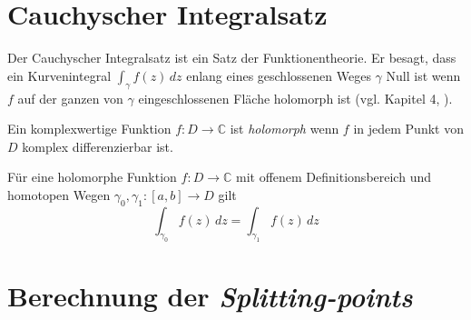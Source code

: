 \section{Cauchyscher Integralsatz}

Der Cauchyscher Integralsatz ist ein Satz der Funktionentheorie. Er besagt, dass ein Kurvenintegral $\int_{\gamma}^{} f(z)\,dz $ enlang eines geschlossenen Weges $\gamma$ Null ist wenn
$f$ auf der ganzen von $\gamma$ eingeschlossenen Fläche holomorph ist (vgl. Kapitel 4, \cite{futheo}).

Ein komplexwertige Funktion $f: D \rightarrow \mathbb{C}$ ist \textit{holomorph} wenn $f$ in jedem Punkt von $D$ komplex differenzierbar ist.
\cite{futheo}

Für eine holomorphe Funktion $f: D \rightarrow \mathbb{C}$ mit offenem Definitionsbereich und homotopen Wegen $\gamma_0, \gamma_1: [a,b] \rightarrow D$ gilt 
\begin{equation}
    \int_{\gamma_0}^{} f(z) \,dz = \int_{\gamma_1}^{} f(z) \,dz 
\end{equation}







\section{Berechnung der \textit{Splitting-points}}

